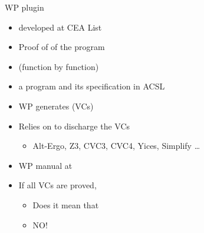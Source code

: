 \begin{frame}{WP plugin}
\begin{itemize}
\item {} developed at CEA List
\item Proof of  of the program
\item {} (function by function)
\item {} a program and its specification in ACSL
\item WP generates  (VCs)
\item Relies on  to discharge the VCs
\begin{itemize}\item  Alt-Ergo, Z3, CVC3, CVC4, Yices, Simplify \dots\end{itemize}
\item WP manual at 
\item If all VCs are proved,  
\begin{itemize} 
\item Does it mean that 
\item<2->NO! 
\end{itemize}
\end{itemize}
\end{frame}


